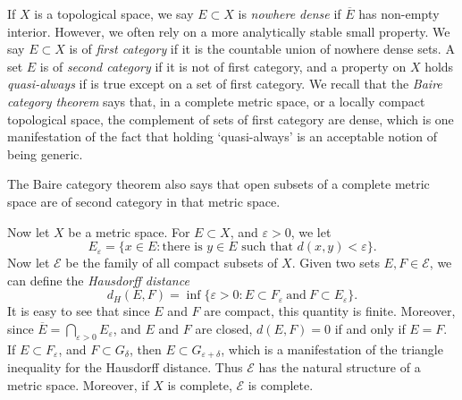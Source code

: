 If $X$ is a topological space, we say $E \subset X$ is \emph{nowhere dense} if $\overline{E}$ has non-empty interior. However, we often rely on a more analytically stable small property. We say $E \subset X$ is of \emph{first category} if it is the countable union of nowhere dense sets. A set $E$ is of \emph{second category} if it is not of first category, and a property on $X$ holds \emph{quasi-always} if is true except on a set of first category. We recall that the \emph{Baire category theorem} says that, in a complete metric space, or a locally compact topological space, the complement of sets of first category are dense, which is one manifestation of the fact that holding `quasi-always' is an acceptable notion of being generic.

\begin{remark}
	The Baire category theorem also says that open subsets of a complete metric space are of second category in that metric space.
\end{remark}

Now let $X$ be a metric space. For $E \subset X$, and $\varepsilon > 0$, we let
%
\[ E_\varepsilon = \{ x \in E: \text{there is $y \in E$ such that $d(x,y) < \varepsilon$} \}. \]
%
Now let $\mathcal{E}$ be the family of all compact subsets of $X$. Given two sets $E, F \in \mathcal{E}$, we can define the \emph{Hausdorff distance}
%
\[ d_H(E,F) = \inf \{ \varepsilon > 0: E \subset F_\varepsilon\ \text{and}\ F \subset E_\varepsilon \}. \]
%
It is easy to see that since $E$ and $F$ are compact, this quantity is finite. Moreover, since $\overline{E} = \bigcap_{\varepsilon > 0} E_\varepsilon$, and $E$ and $F$ are closed, $d(E,F) = 0$ if and only if $E = F$. If $E \subset F_\varepsilon$, and $F \subset G_\delta$, then $E \subset G_{\varepsilon + \delta}$, which is a manifestation of the triangle inequality for the Hausdorff distance. Thus $\mathcal{E}$ has the natural structure of a metric space. Moreover, if $X$ is complete, $\mathcal{E}$ is complete.

